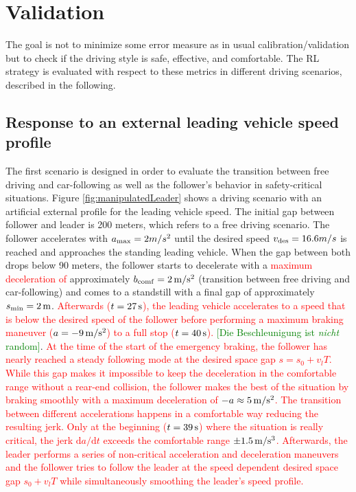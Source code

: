 \documentclass[review]{elsarticle}
\providecommand{\red}[1]{\textcolor{red}{#1}}
\providecommand{\green}[1]{\textcolor{green}{#1}}
\providecommand{\martin}[1]{\red{#1}} %
\providecommand{\martinc}[1]{\green{[#1]}} %
\providecommand{\3}{{\ss}}
\begin{document}
\section{Validation}

The goal is not to minimize some error measure as in usual
calibration/validation but to check if the driving style is safe,
effective, and comfortable. The RL strategy is evaluated with respect to these metrics in different driving scenarios, described in the following.

\subsection{Response to an external leading vehicle speed profile}
The first scenario is designed in order to evaluate the transition between free driving and car-following as well as the follower's behavior in safety-critical situations. 
Figure \ref{fig:manipulatedLeader} shows a driving scenario with an
artificial external profile for the leading vehicle speed. The initial
gap between 
follower and leader is 200 meters, which refers to a free driving
scenario. The follower accelerates with $a_{\rm max} = 2m/s^2$ until
the desired speed $v_{\rm des} = 16.6m/s$ is reached and approaches
the standing leading vehicle. When the gap between both drops below 90
meters, the follower starts to decelerate with a \martin{maximum
  deceleration of} approximately $b_{\rm
  comf} = \unit[2]{m/s^2}$ (transition between free driving and car-following)
and comes to a standstill with a final gap of approximately 
$s_{\rm min} = \unit[2]{m}$. \martin{Afterwards ($t=\unit[27]{s}$),  the leading vehicle accelerates to a speed
that is below the desired speed of the follower before performing a
maximum braking maneuver ($a=\unit[-9]{m/s^2}$) to a full stop ($t=\unit[40]{s}$).} \martinc{Die Beschleunigung
  ist \emph{nicht} random}. \martin{At the time of the start of the
  emergency braking, the follower has nearly reached a steady
  following mode at the desired space gap $s=s_0+v_l T$. While this
  gap makes it impossible to keep the deceleration in the comfortable
  range without a rear-end collision, the follower makes the best of
  the situation by braking smoothly with a maximum deceleration of $-a
  \approx \unit[5]{m/s^2}$.  The transition between different
accelerations happens in a comfortable way reducing the resulting
jerk. Only at the beginning ($t=\unit[39]{s}$) where the situation is
really critical, the jerk $\text{d}a/\text{d}t$ exceeds the comfortable range 
$\pm \unit[1.5]{m/s^3}$. Afterwards, the leader performs a series of
non-critical acceleration and deceleration maneuvers and the follower
tries to follow the leader at the speed dependent desired space gap
$s_0+v_lT$ while 
simultaneously smoothing the leader's speed profile.} 
\end{document}
